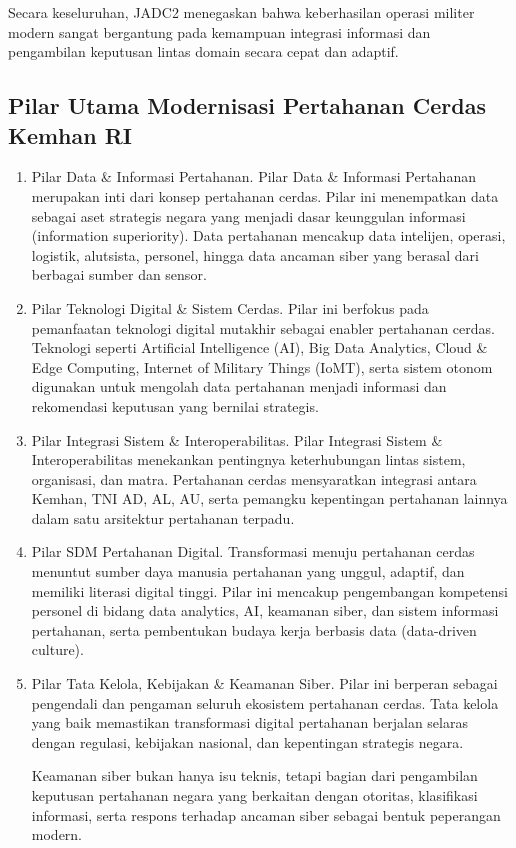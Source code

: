 Secara keseluruhan, JADC2 menegaskan bahwa keberhasilan operasi militer modern sangat bergantung pada kemampuan integrasi informasi dan pengambilan keputusan lintas domain secara cepat dan adaptif.

\subsection{Pilar Utama Modernisasi Pertahanan Cerdas Kemhan RI}
\begin{enumerate}
  \item Pilar Data \& Informasi Pertahanan.
  Pilar Data \& Informasi Pertahanan merupakan inti dari konsep pertahanan cerdas.
  Pilar ini menempatkan data sebagai aset strategis negara yang menjadi dasar keunggulan informasi (information superiority).
  Data pertahanan mencakup data intelijen, operasi, logistik, alutsista, personel, hingga data ancaman siber yang berasal dari berbagai sumber dan sensor.
  \item Pilar Teknologi Digital \& Sistem Cerdas.
  Pilar ini berfokus pada pemanfaatan teknologi digital mutakhir sebagai enabler pertahanan cerdas.
  Teknologi seperti Artificial Intelligence (AI), Big Data Analytics, Cloud \& Edge Computing, Internet of Military Things (IoMT), serta sistem otonom digunakan untuk mengolah data pertahanan menjadi informasi dan rekomendasi keputusan yang bernilai strategis.
  \item Pilar Integrasi Sistem \& Interoperabilitas.
  Pilar Integrasi Sistem \& Interoperabilitas menekankan pentingnya keterhubungan lintas sistem, organisasi, dan matra.
  Pertahanan cerdas mensyaratkan integrasi antara Kemhan, TNI AD, AL, AU, serta pemangku kepentingan pertahanan lainnya dalam satu arsitektur pertahanan terpadu.
  \item Pilar SDM Pertahanan Digital.
  Transformasi menuju pertahanan cerdas menuntut sumber daya manusia pertahanan yang unggul, adaptif, dan memiliki literasi digital tinggi.
  Pilar ini mencakup pengembangan kompetensi personel di bidang data analytics, AI, keamanan siber, dan sistem informasi pertahanan, serta pembentukan budaya kerja berbasis data (data-driven culture).
  \item Pilar Tata Kelola, Kebijakan \& Keamanan Siber.
  Pilar ini berperan sebagai pengendali dan pengaman seluruh ekosistem pertahanan cerdas.
  Tata kelola yang baik memastikan transformasi digital pertahanan berjalan selaras dengan regulasi, kebijakan nasional, dan kepentingan strategis negara.

  Keamanan siber bukan hanya isu teknis, tetapi bagian dari pengambilan keputusan pertahanan negara yang berkaitan dengan otoritas, klasifikasi informasi, serta respons terhadap ancaman siber sebagai bentuk peperangan modern.


\end{enumerate}
